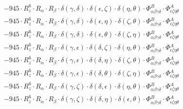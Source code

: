 \documentclass{article}
\begin{document}
\begin{equation}
\begin{array}{c}
 \\[0.2em] 		 - 945 \cdot R_{z}^{6} \cdot R_{\alpha{}} \cdot R_{\beta{}} \cdot \delta{}\left(\gamma{}, \delta{}\right) \cdot \delta{}\left(\epsilon{}, \zeta{}\right) \cdot \delta{}\left(\eta{}, \theta{}\right) \cdot \Phi{}^{B}_{\alpha{}\beta{}\gamma{}\delta{}} \cdot \Phi{}^{A}_{\epsilon{}\zeta{}\eta{}\theta{}} 
 \\[0.2em] 		 - 945 \cdot R_{z}^{6} \cdot R_{\alpha{}} \cdot R_{\beta{}} \cdot \delta{}\left(\gamma{}, \delta{}\right) \cdot \delta{}\left(\epsilon{}, \eta{}\right) \cdot \delta{}\left(\zeta{}, \theta{}\right) \cdot \Phi{}^{B}_{\alpha{}\beta{}\gamma{}\delta{}} \cdot \Phi{}^{A}_{\epsilon{}\zeta{}\eta{}\theta{}} 
 \\[0.2em] 		 - 945 \cdot R_{z}^{6} \cdot R_{\alpha{}} \cdot R_{\beta{}} \cdot \delta{}\left(\gamma{}, \delta{}\right) \cdot \delta{}\left(\epsilon{}, \theta{}\right) \cdot \delta{}\left(\zeta{}, \eta{}\right) \cdot \Phi{}^{B}_{\alpha{}\beta{}\gamma{}\delta{}} \cdot \Phi{}^{A}_{\epsilon{}\zeta{}\eta{}\theta{}} 
 \\[0.2em] 		 - 945 \cdot R_{z}^{6} \cdot R_{\alpha{}} \cdot R_{\beta{}} \cdot \delta{}\left(\gamma{}, \epsilon{}\right) \cdot \delta{}\left(\delta{}, \zeta{}\right) \cdot \delta{}\left(\eta{}, \theta{}\right) \cdot \Phi{}^{B}_{\alpha{}\beta{}\gamma{}\delta{}} \cdot \Phi{}^{A}_{\epsilon{}\zeta{}\eta{}\theta{}} 
 \\[0.2em] 		 - 945 \cdot R_{z}^{6} \cdot R_{\alpha{}} \cdot R_{\beta{}} \cdot \delta{}\left(\gamma{}, \epsilon{}\right) \cdot \delta{}\left(\delta{}, \eta{}\right) \cdot \delta{}\left(\zeta{}, \theta{}\right) \cdot \Phi{}^{B}_{\alpha{}\beta{}\gamma{}\delta{}} \cdot \Phi{}^{A}_{\epsilon{}\zeta{}\eta{}\theta{}} 
 \\[0.2em] 		 - 945 \cdot R_{z}^{6} \cdot R_{\alpha{}} \cdot R_{\beta{}} \cdot \delta{}\left(\gamma{}, \epsilon{}\right) \cdot \delta{}\left(\delta{}, \theta{}\right) \cdot \delta{}\left(\zeta{}, \eta{}\right) \cdot \Phi{}^{B}_{\alpha{}\beta{}\gamma{}\delta{}} \cdot \Phi{}^{A}_{\epsilon{}\zeta{}\eta{}\theta{}} 
 \\[0.2em] 		 - 945 \cdot R_{z}^{6} \cdot R_{\alpha{}} \cdot R_{\beta{}} \cdot \delta{}\left(\gamma{}, \zeta{}\right) \cdot \delta{}\left(\delta{}, \epsilon{}\right) \cdot \delta{}\left(\eta{}, \theta{}\right) \cdot \Phi{}^{B}_{\alpha{}\beta{}\gamma{}\delta{}} \cdot \Phi{}^{A}_{\epsilon{}\zeta{}\eta{}\theta{}} 
 \\[0.2em] 		 - 945 \cdot R_{z}^{6} \cdot R_{\alpha{}} \cdot R_{\beta{}} \cdot \delta{}\left(\gamma{}, \zeta{}\right) \cdot \delta{}\left(\delta{}, \eta{}\right) \cdot \delta{}\left(\epsilon{}, \theta{}\right) \cdot \Phi{}^{B}_{\alpha{}\beta{}\gamma{}\delta{}} \cdot \Phi{}^{A}_{\epsilon{}\zeta{}\eta{}\theta{}} 

\end{array}
\end{equation}
\end{document}
